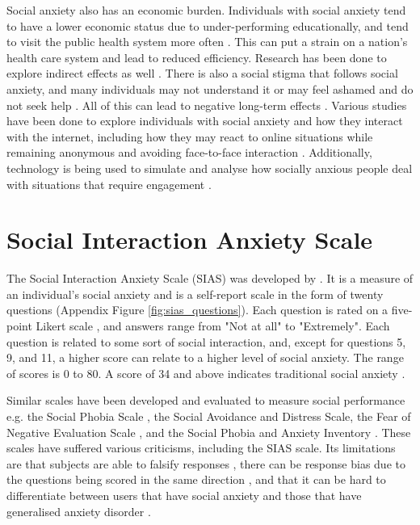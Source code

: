 \documentclass{l4proj}
\begin{document}
Social anxiety also has an economic burden. Individuals with social anxiety tend to have a lower economic status due to under-performing educationally, and tend to visit the public health system more often \citep{social_anxiety_economic_burden}. This can put a strain on a nation's health care system and lead to reduced efficiency. Research has been done to explore indirect effects as well \citep{cost_of_social_anxiety, cost_in_europe}. There is also a social stigma that follows social anxiety, and many individuals may not understand it or may feel ashamed and do not seek help \citep{ACARTURK2009421}. All of this can lead to negative long-term effects \citep{kings}. Various studies have been done to explore individuals with social anxiety and how they interact with the internet, including how they may react to online situations while remaining anonymous and avoiding face-to-face interaction \citep{SHEPHERD2005949}. Additionally, technology is being used to simulate and analyse how socially anxious people deal with situations that require engagement \citep{avoidance_behaviour}.


\section{Social Interaction Anxiety Scale}
The Social Interaction Anxiety Scale (SIAS) was developed by \cite{sias_origin_unpublished, sias_origin}. It is a measure of an individual's social anxiety and is a self-report scale in the form of twenty questions (Appendix Figure \ref{fig:sias_questions}). Each question is rated on a five-point Likert scale \citep{sias_origin}, and answers range from "Not at all" to "Extremely". Each question is related to some sort of social interaction, and, except for questions 5, 9, and 11, a higher score can relate to a higher level of social anxiety. The range of scores is 0 to 80. A score of 34 and above indicates traditional social anxiety \citep{sias_score_34}.

Similar scales have been developed and evaluated to measure social performance e.g. the Social Phobia Scale \citep{sias_origin_unpublished, sias_origin, phobia_1, phobia_2, phobia_3}, the Social Avoidance and Distress Scale, the Fear of Negative Evaluation Scale \citep{1969_scales, heimberg_scales}, and the Social Phobia and Anxiety Inventory \citep{social_phobia_anxiety_inventory, inventory_anxiety}. These scales have suffered various criticisms, including the SIAS scale. Its limitations are that subjects are able to falsify responses \citep{sias_origin}, there can be response bias due to the questions being scored in the same direction \citep{sias_origin}, and that it can be hard to differentiate between users that have social anxiety and those that have generalised anxiety disorder \citep{phobia_2}.
\end{document}
